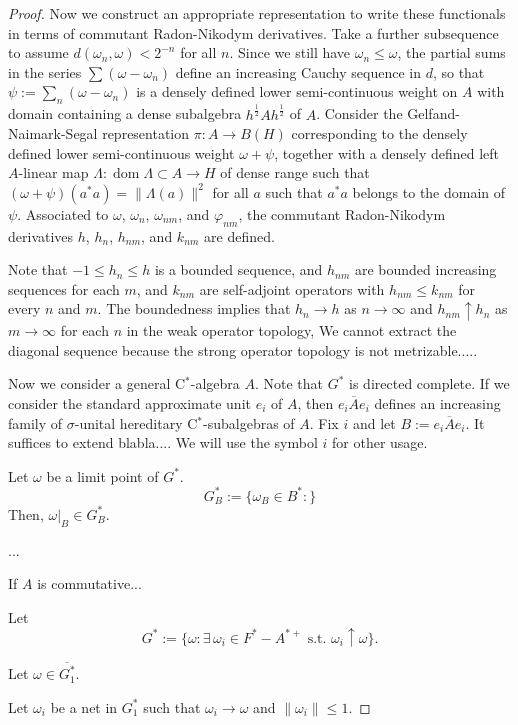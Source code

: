 \documentclass[a4paper]{amsart}
\theoremstyle{plain}
\theoremstyle{definition}
\begin{document}
\begin{proof}
Now we construct an appropriate representation to write these functionals in terms of commutant Radon-Nikodym derivatives.
Take a further subsequence to assume $d(\omega_n,\omega)<2^{-n}$ for all $n$.
Since we still have $\omega_n\le\omega$, the partial sums in the series $\sum(\omega-\omega_n)$ define an increasing Cauchy sequence in $d$, so that $\psi:=\sum_n(\omega-\omega_n)$ is a densely defined lower semi-continuous weight on $A$ with domain containing a dense subalgebra $h^{\frac12}Ah^{\frac12}$ of $A$.
Consider the Gelfand-Naimark-Segal representation $\pi:A\to B(H)$ corresponding to the densely defined lower semi-continuous weight $\omega+\psi$, together with a densely defined left $A$-linear map $\Lambda:\operatorname{dom}\Lambda\subset A\to H$ of dense range such that $(\omega+\psi)(a^*a)=\|\Lambda(a)\|^2$ for all $a$ such that $a^*a$ belongs to the domain of $\psi$.
Associated to $\omega$, $\omega_n$, $\omega_{nm}$, and $\varphi_{nm}$, the commutant Radon-Nikodym derivatives $h$, $h_n$, $h_{nm}$, and $k_{nm}$ are defined.

Note that $-1\le h_n\le h$ is a bounded sequence, and $h_{nm}$ are bounded increasing sequences for each $m$, and $k_{nm}$ are self-adjoint operators with $h_{nm}\le k_{nm}$ for every $n$ and $m$.
The boundedness implies that $h_n\to h$ as $n\to\infty$ and $h_{nm}\uparrow h_n$ as $m\to\infty$ for each $n$ in the weak operator topology,
We cannot extract the diagonal sequence because the strong operator topology is not metrizable.....




Now we consider a general C$^*$-algebra $A$.
Note that $G^*$ is directed complete.
If we consider the standard approximate unit $e_i$ of $A$, then $\overline{e_iAe_i}$ defines an increasing family of $\sigma$-unital hereditary C$^*$-subalgebras of $A$.
Fix $i$ and let $B:=\overline{e_iAe_i}$.
It suffices to extend blabla....
We will use the symbol $i$ for other usage.

Let $\omega$ be a limit point of $G^*$.
\[G^*_B:=\{\omega_B\in B^*:\}\]
Then, $\omega|_B\in G^*_B$.






...

If $A$ is commutative...

Let
\[G^*:=\{\omega:\exists\,\omega_i\in F^*-A^{*+}\text{ s.t. }\omega_i\uparrow\omega\}.\]

Let $\omega\in\overline{G^*_1}$.

Let $\omega_i$ be a net in $G^*_1$ such that $\omega_i\to\omega$ and $\|\omega_i\|\le1$.


\end{proof}
\end{document}
